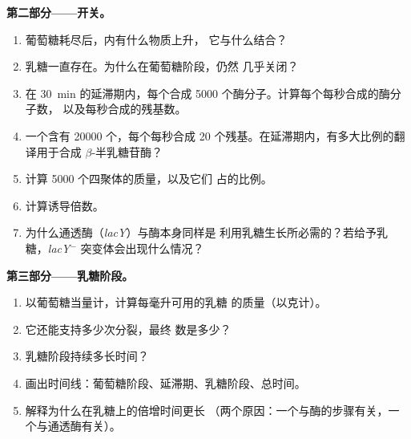 \begin{problem}
\medskip
\noindent\textbf{第二部分——开关。}
\begin{enumerate}[resume]
  \item 葡萄糖耗尽后，内有什么物质上升，
        它与什么结合？
  \item 乳糖一直存在。为什么在葡萄糖阶段，仍然
        几乎关闭？
  \item 在 \qty{30}{min} 的延滞期内，每个合成 \num{5000}
        个酶分子。计算每个每秒合成的酶分子数，
        以及每秒合成的残基数。
  \item 一个含有 \num{20000} 个，每个每秒合成 \qty{20}{}
        个残基。在延滞期内，有多大比例的翻译用于合成
        $\beta$-半乳糖苷酶？
  \item 计算 \num{5000} 个四聚体的质量，以及它们
        占的比例。
  \item 计算诱导倍数。
  \item 为什么通透酶（\emph{lacY}）与酶本身同样是
        利用乳糖生长所必需的？若给予乳糖，\emph{lacY}$^-$
        突变体会出现什么情况？
\end{enumerate}

\medskip
\noindent\textbf{第三部分——乳糖阶段。}
\begin{enumerate}[resume]
  \item 以葡萄糖当量计，计算每毫升可用的乳糖
        的质量（以克计）。
  \item 它还能支持多少次分裂，最终
        数是多少？
  \item 乳糖阶段持续多长时间？
  \item 画出时间线：葡萄糖阶段、延滞期、乳糖阶段、总时间。
  \item 解释为什么在乳糖上的倍增时间更长
        （两个原因：一个与酶的步骤有关，一个与通透酶有关）。
\end{enumerate}


\end{problem}

